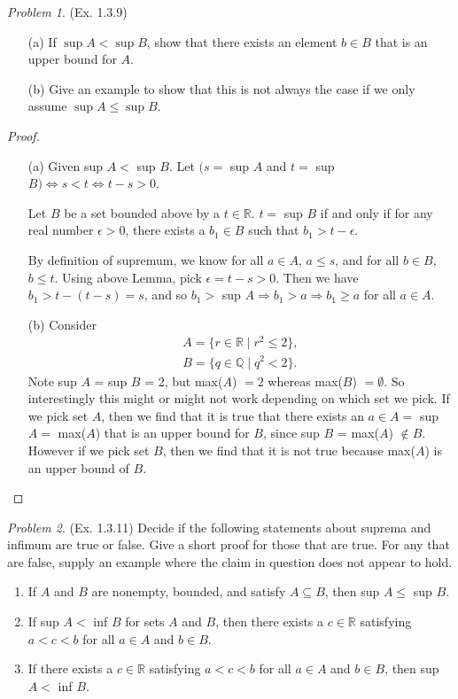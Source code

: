 \documentclass[11pt,twoside, reqno, align]{amsart}
\theoremstyle{remark}
\newtheorem{Prob}{Problem}
\def\R{\mathbb R}
\def\Q{\mathbb Q}
\renewcommand{\implies}{\Rightarrow}
\renewcommand{\iff}{\Leftrightarrow}
\begin{document}
\begin{Prob}(Ex. 1.3.9)
\begin{enumerate}
    \item[(a)] If $\sup A< \sup B$, show that there exists an element $b\in B$ that is an upper bound for $A$.
    \item[(b)] Give an example to show that this is not always the case if we only assume $\sup A\leq \sup B$.
\end{enumerate}
\end{Prob}

\begin{proof}\;
\begin{enumerate}
    \item[(a)] Given sup $A <$ sup $B$. Let $(s =$ sup $A$ and $t =$ sup $B) \iff s < t \iff t-s > 0$.
    
    \newtheorem{Lm}[Lemma]: Let $B$ be a set bounded above by a $t \in \R$. $t =$ sup $B$ if and only if for any real number $\epsilon > 0$, there exists a $b_1 \in B$ such that $b_1 > t - \epsilon$.
    
    By definition of supremum, we know for all $a \in A$, $a \leq s$, and for all $b \in B$, $b \leq t$. Using above Lemma, pick $\epsilon = t - s > 0$. Then we have $b_1 > t - (t-s) = s$, and so $b_1 >$ sup $A \implies b_1 > a \implies b_1 \geq a$ for all $a \in A$.  
    \item[(b)] Consider 
    \begin{align*}
        A = \{r \in \R \mid r^2 \leq 2\}, \\
        B = \{q \in \Q \mid q^2 < 2\}.
    \end{align*}
    Note sup $A$ = sup $B$ = 2, but max($A$) $= 2$ whereas max($B$) $= \emptyset$. So interestingly this might or might not work depending on which set we pick. If we pick set $A$, then we find that it is true that there exists an $a \in A =$ sup $A =$ max($A$) that is an upper bound for $B$, since sup $B$ = max($A$) $\not \in B$. However if we pick set $B$, then we find that it is not true because max($A$) is an upper bound of $B$.
\end{enumerate}
\end{proof}

\begin{Prob}(Ex. 1.3.11)
Decide if the following statements about suprema and infimum are true or false. Give a short proof for those that are true. For any that are false, supply an example where the claim in question does not appear to hold.
\begin{enumerate}[label=(\alph*)]
    \item If $A$ and $B$ are nonempty, bounded, and satisfy $A \subseteq B$, then sup $A \leq$ sup $B$.
    \item If sup $A <$ inf $B$ for sets $A$ and $B$, then there exists a $c \in \R$ satisfying $a < c < b$ for all $a \in A$ and $b \in B$.
    \item If there exists a $c \in \R$ satisfying $a < c < b$ for all $a \in A$ and $b \in B$, then sup $A <$ inf $B$.
\end{enumerate}
\end{Prob}
\end{document}
